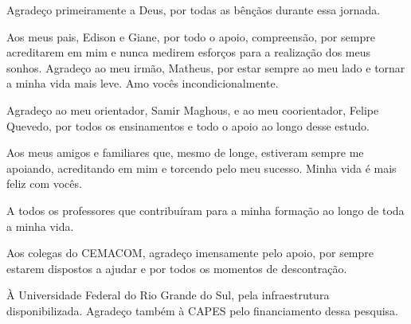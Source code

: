 %
%
%
%

Agradeço primeiramente a Deus, por todas as bênçãos durante essa jornada.

Aos meus pais, Edison e Giane, por todo o apoio, compreensão, por sempre acreditarem em mim e nunca medirem esforços para a realização dos meus sonhos. Agradeço ao meu irmão, Matheus, por estar sempre ao meu lado e tornar a minha vida mais leve. Amo vocês incondicionalmente.

Agradeço ao meu orientador, Samir Maghous, e ao meu coorientador, Felipe Quevedo, por todos os ensinamentos e todo o apoio ao longo desse estudo.

Aos meus amigos e familiares que, mesmo de longe, estiveram sempre me apoiando, acreditando em mim e torcendo pelo meu sucesso. Minha vida é mais feliz com vocês.

A todos os professores que contribuíram para a minha formação ao longo de toda a minha vida.

Aos colegas do CEMACOM, agradeço imensamente pelo apoio, por sempre estarem dispostos a ajudar e por todos os momentos de descontração.

À Universidade Federal do Rio Grande do Sul, pela infraestrutura disponibilizada. Agradeço também à CAPES pelo financiamento dessa pesquisa.